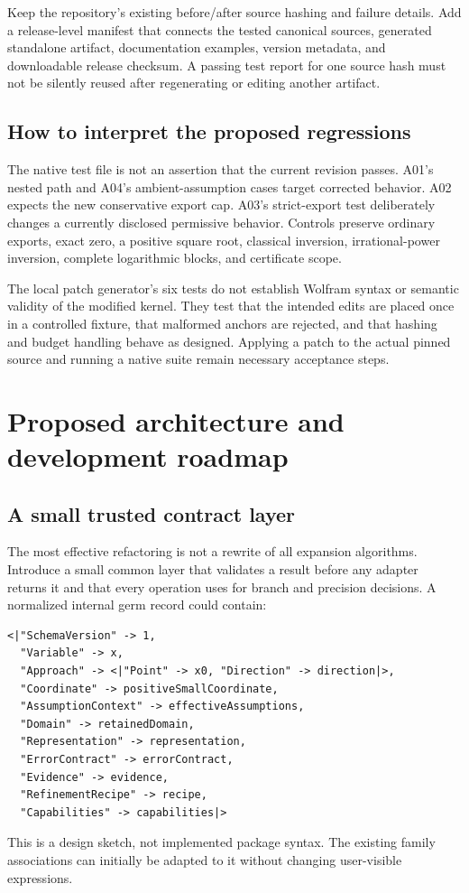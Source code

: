 \documentclass[11pt,a4paper]{article}
\theoremstyle{remark}\newtheorem{remark}[proposition]{Remark}
\begin{document}
Keep the repository's existing before/after source hashing and failure details. Add a release-level manifest that connects the tested canonical sources, generated standalone artifact, documentation examples, version metadata, and downloadable release checksum. A passing test report for one source hash must not be silently reused after regenerating or editing another artifact.\cite{runner,development}

\subsection{How to interpret the proposed regressions}
The native test file is not an assertion that the current revision passes. A01's nested path and A04's ambient-assumption cases target corrected behavior. A02 expects the new conservative export cap. A03's strict-export test deliberately changes a currently disclosed permissive behavior. Controls preserve ordinary exports, exact zero, a positive square root, classical inversion, irrational-power inversion, complete logarithmic blocks, and certificate scope.

The local patch generator's six tests do not establish Wolfram syntax or semantic validity of the modified kernel. They test that the intended edits are placed once in a controlled fixture, that malformed anchors are rejected, and that hashing and budget handling behave as designed. Applying a patch to the actual pinned source and running a native suite remain necessary acceptance steps.



\section{Proposed architecture and development roadmap}
\subsection{A small trusted contract layer}
The most effective refactoring is not a rewrite of all expansion algorithms. Introduce a small common layer that validates a result before any adapter returns it and that every operation uses for branch and precision decisions. A normalized internal germ record could contain:
\begin{lstlisting}
<|"SchemaVersion" -> 1,
  "Variable" -> x,
  "Approach" -> <|"Point" -> x0, "Direction" -> direction|>,
  "Coordinate" -> positiveSmallCoordinate,
  "AssumptionContext" -> effectiveAssumptions,
  "Domain" -> retainedDomain,
  "Representation" -> representation,
  "ErrorContract" -> errorContract,
  "Evidence" -> evidence,
  "RefinementRecipe" -> recipe,
  "Capabilities" -> capabilities|>
\end{lstlisting}
This is a design sketch, not implemented package syntax. The existing family associations can initially be adapted to it without changing user-visible expressions.
\end{document}
